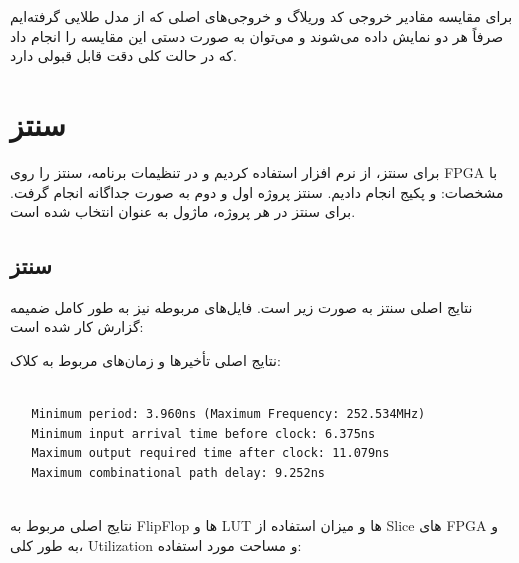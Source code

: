 \documentclass[12pt,titlepage,a4page , tikz , multi,table , svgnames,xcdraw]{article}
\begin{document}
برای مقایسه مقادیر خروجی کد وریلاگ و خروجی‌های اصلی که از مدل طلایی گرفته‌ایم صرفاً هر دو نمایش داده می‌شوند و می‌توان به صورت دستی این مقایسه را انجام داد که در حالت کلی دقت قابل قبولی دارد.


\newpage


\section{سنتز}

برای سنتز، از نرم افزار  استفاده کردیم و در تنظیمات برنامه، سنتز را روی FPGA با مشخصات:  و پکیج  انجام دادیم. سنتز پروژه اول و دوم به صورت جداگانه انجام گرفت. برای سنتز در هر پروژه، ماژول  به عنوان  انتخاب شده است.

\subsection{سنتز }

نتایج اصلی سنتز به صورت زیر است. فایل‌های مربوطه نیز به طور کامل ضمیمه گزارش کار شده است:

نتایج اصلی تأخیرها و زمان‌های مربوط به کلاک:

\begin{latin}
\begin{verbatim}

   Minimum period: 3.960ns (Maximum Frequency: 252.534MHz)
   Minimum input arrival time before clock: 6.375ns
   Maximum output required time after clock: 11.079ns
   Maximum combinational path delay: 9.252ns


\end{verbatim}
\end{latin}


نتایج اصلی مربوط به FlipFlop ها و LUT ها و میزان استفاده از Slice های FPGA و به طور کلی، Utilization و مساحت مورد استفاده:
\end{document}
